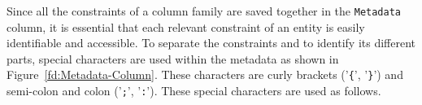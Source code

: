 % 	
		
Since all the  constraints of a column family are saved together in the
\texttt{Metadata} column,  it is essential that each relevant constraint of an
entity is easily identifiable and accessible.  To separate the constraints and
to identify its different parts, special characters are used within the metadata
as shown in Figure~\ref{fd:Metadata-Column}. These characters are curly brackets
('\texttt{\{}', '\texttt{\}}') and semi-colon and colon ('\texttt{;}',
'\texttt{:}'). These special characters are used as follows.



% 
% 


	
